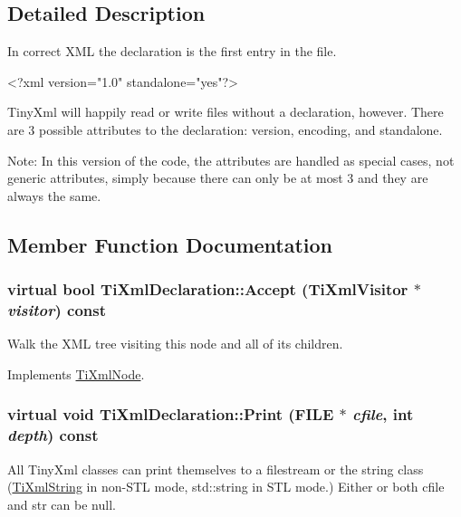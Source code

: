 \subsection{Detailed Description}
In correct XML the declaration is the first entry in the file. \begin{DoxyVerb}
		<?xml version="1.0" standalone="yes"?>
	\end{DoxyVerb}


TinyXml will happily read or write files without a declaration, however. There are 3 possible attributes to the declaration: version, encoding, and standalone.

Note: In this version of the code, the attributes are handled as special cases, not generic attributes, simply because there can only be at most 3 and they are always the same. 

\subsection{Member Function Documentation}
\hypertarget{class_ti_xml_declaration_a22315a535983b86535cdba3458669e3e}{
\subsubsection[{Accept}]{\setlength{\rightskip}{0pt plus 5cm}virtual bool TiXmlDeclaration::Accept ({\bf TiXmlVisitor} $\ast$ {\em visitor}) const}}
\label{class_ti_xml_declaration_a22315a535983b86535cdba3458669e3e}
Walk the XML tree visiting this node and all of its children. 

Implements \hyperlink{class_ti_xml_node_acc0f88b7462c6cb73809d410a4f5bb86}{TiXmlNode}.\hypertarget{class_ti_xml_declaration_abf6303db4bd05b5be554036817ff1cb4}{
\subsubsection[{Print}]{\setlength{\rightskip}{0pt plus 5cm}virtual void TiXmlDeclaration::Print (FILE $\ast$ {\em cfile}, \/  int {\em depth}) const}}
\label{class_ti_xml_declaration_abf6303db4bd05b5be554036817ff1cb4}
All TinyXml classes can print themselves to a filestream or the string class (\hyperlink{class_ti_xml_string}{TiXmlString} in non-\/STL mode, std::string in STL mode.) Either or both cfile and str can be null.

